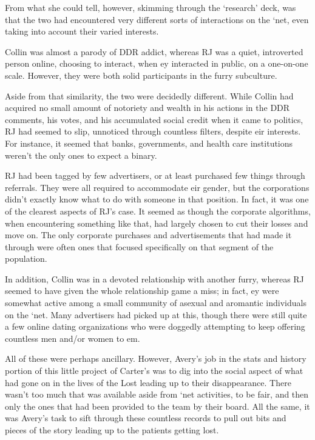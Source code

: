 From what she could tell, however, skimming through the `research' deck, was that the two had encountered very different sorts of interactions on the `net, even taking into account their varied interests.

Collin was almost a parody of DDR addict, whereas RJ was a quiet, introverted person online, choosing to interact, when ey interacted in public, on a one-on-one scale. However, they were both solid participants in the furry subculture.

Aside from that similarity, the two were decidedly different. While Collin had acquired no small amount of notoriety and wealth in his actions in the DDR comments, his votes, and his accumulated social credit when it came to politics, RJ had seemed to slip, unnoticed through countless filters, despite eir interests. For instance, it seemed that banks, governments, and health care institutions weren't the only ones to expect a binary.

RJ had been tagged by few advertisers, or at least purchased few things through referrals. They were all required to accommodate eir gender, but the corporations didn't exactly know what to do with someone in that position. In fact, it was one of the clearest aspects of RJ's case. It seemed as though the corporate algorithms, when encountering something like that, had largely chosen to cut their losses and move on. The only corporate purchases and advertisements that had made it through were often ones that focused specifically on that segment of the population.

In addition, Collin was in a devoted relationship with another furry, whereas RJ seemed to have given the whole relationship game a miss; in fact, ey were somewhat active among a small community of asexual and aromantic individuals on the `net. Many advertisers had picked up at this, though there were still quite a few online dating organizations who were doggedly attempting to keep offering countless men and/or women to em.

All of these were perhaps ancillary. However, Avery's job in the stats and history portion of this little project of Carter's was to dig into the social aspect of what had gone on in the lives of the Lost leading up to their disappearance. There wasn't too much that was available aside from `net activities, to be fair, and then only the ones that had been provided to the team by their board. All the same, it was Avery's task to sift through these countless records to pull out bits and pieces of the story leading up to the patients getting lost.

